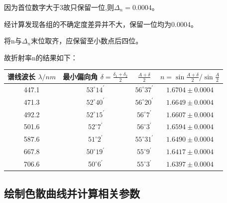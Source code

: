 \documentclass[UTF8]{ctexart}
\begin{document}
因为首位数字大于3故只保留一位,则$\Delta_{n}=0.0004$。

经计算发现各组的不确定度差异并不大，保留一位均为0.0004。

将n与$\Delta_n$末位取齐，应保留至小数点后四位。

故折射率n的结果如下：
\begin{center}
    \begin{tabular}{|c|c|c|c|}
        \hline  谱线波长 $ \lambda / n m$ &  最小偏向角 $ \delta=\frac{\delta_{1}+\delta_{2}}{2}$ & $\frac{A+\delta}{2}$ & $n=\sin \frac{A+\delta}{2} / \sin \frac{A}{2}$ \\
        \hline 447.1 & $53^{\circ} 14^{\prime}$ & $56^{\circ} 37^{\prime}$ & $1.6704 \pm 0.0004$ \\
        \hline 471.3 & $52^{\circ} 40^{\prime}$ & $56^{\circ} 20^{\prime}$ & $1.6649 \pm 0.0004$ \\
        \hline 492.2 & $52^{\circ} 15^{\prime}$ & $56^{\circ} 7^{\prime}$ & $1.6607 \pm 0.0004$ \\
        \hline 501.6 & $52^{\circ} 7^{\prime}$ & $56^{\circ} 3^{\prime}$ & $1.6594 \pm 0.0004 $\\
        \hline 587.6 & $51^{\circ} 2^{\prime}$ & $55^{\circ} 31^{\prime}$ & $1.6490 \pm 0.0004 $\\
        \hline 667.8 & $50^{\circ} 19^{\prime}$ & $55^{\circ} 9^{\prime}$ & $1.6417 \pm 0.0004$ \\
        \hline 706.6 & 5$0^{\circ} 6^{\prime}$ & $55^{\circ} 3^{\prime}$ & $1.6397 \pm 0.0004$ \\
        \hline
        \end{tabular}
\end{center}

\subsection{绘制色散曲线并计算相关参数}
\end{document}
